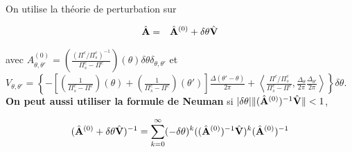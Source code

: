 On utilise la théorie de perturbation sur 

\begin{eqnarray*}
	\hat{\mathbf{A}} & = & \hat{\mathbf{A}}^{(0)} + \delta \theta \hat{\mathbf{V}}
\end{eqnarray*}

avec $A^{(0)}_{\theta , \theta'} = \left ( \frac{ ( \Pi^c/\Pi^c_s)^{-1}}{\Pi^c_s - \Pi^c} \right )(\theta) \delta \theta   \delta_{\theta,\theta '}$ et $V_{\theta , \theta'} = \left \{ - \left [ \left ( \frac{1}{\Pi^c_s - \Pi^c } \right ) ( \theta)  + \left ( \frac{1}{\Pi^c_s - \Pi^c } \right ) ( \theta' )\right ] \frac{ \Delta( \theta'- \theta )}{ 2 \pi } + \left \langle  \frac{ \Pi^c/\Pi^c_s}{\Pi^c_s - \Pi^c} , \frac{\Delta_\theta}{2 \pi}\frac{\Delta_{\theta'}}{2 \pi} \right \rangle  \right \} \delta \theta $.\\


{\bf On peut aussi utiliser la formule de Neuman} si $\vert \delta \theta \vert \Vert  (\hat{\mathbf{A}}^{(0)})^{-1} \hat{\mathbf{V}} \Vert < 1 $,

\begin{eqnarray*}
	(\hat{\mathbf{A}}^{(0)} + \delta \theta \hat{\mathbf{V}})^{-1} = \sum_{k=0}^\infty (-\delta \theta)^k ((\hat{\mathbf{A}}^{(0)})^{-1} \hat{\mathbf{V}})^k(\hat{\mathbf{A}}^{(0)})^{-1}
\end{eqnarray*}


